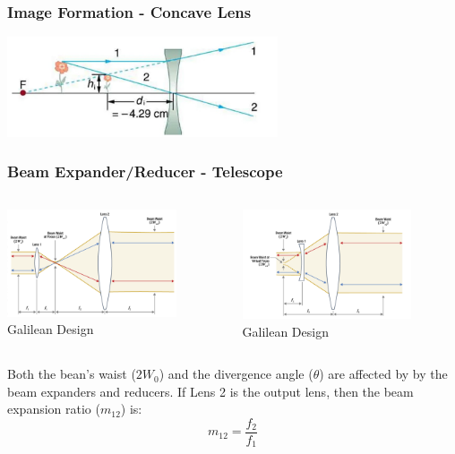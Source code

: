 \documentclass{beamer}
\begin{document}
\begin{frame}\frametitle{Image Formation - Concave Lens}

\begin{center}
\includegraphics[width=8cm]{fig/imageform5.jpg}
\end{center}
\end{frame}


\begin{frame}\frametitle{Beam Expander/Reducer - Telescope}
\begin{columns}
\begin{column}{5.5cm}
\begin{center}
\includegraphics[width=5cm]{fig/beamXkepler.png}
Galilean Design
\end{center}
\end{column}
\begin{column}{5.5cm}
\begin{center}
\includegraphics[width=5cm]{fig/beamXgalileo.png}
Galilean Design
\end{center}
\end{column}
\end{columns}

\vspace{0.25cm}
Both the bean's waist ($2W_0$) and the divergence angle ($\theta$) are affected by by the beam expanders and reducers. If Lens 2 is the output lens, then the beam expansion ratio ($m_{12}$) is: 
\begin{equation}
m_{12} = \frac{f_2}{f_1}
\end{equation}

\end{frame}
\end{document}
